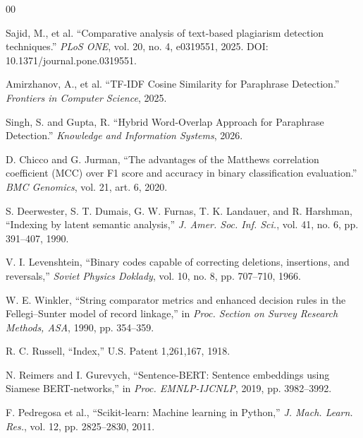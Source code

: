 \documentclass[conference]{IEEEtran}
\begin{document}
\begin{thebibliography}{00}

Sajid, M., et al. ``Comparative analysis of text-based plagiarism
detection techniques.'' \emph{PLoS ONE}, vol. 20, no. 4,
e0319551, 2025. DOI: 10.1371/journal.pone.0319551.

Amirzhanov, A., et al. ``TF-IDF Cosine Similarity for Paraphrase
Detection.'' \emph{Frontiers in Computer Science}, 2025.

Singh, S. and Gupta, R. ``Hybrid Word-Overlap Approach for
Paraphrase Detection.'' \emph{Knowledge and Information Systems},
2026.

D. Chicco and G. Jurman, ``The advantages of the Matthews
correlation coefficient (MCC) over F1 score and accuracy in
binary classification evaluation.'' \emph{BMC Genomics},
vol. 21, art. 6, 2020.

S. Deerwester, S. T. Dumais, G. W. Furnas, T. K. Landauer,
and R. Harshman, ``Indexing by latent semantic analysis,''
\emph{J. Amer. Soc. Inf. Sci.}, vol. 41, no. 6,
pp. 391--407, 1990.

V. I. Levenshtein, ``Binary codes capable of correcting
deletions, insertions, and reversals,'' \emph{Soviet Physics
Doklady}, vol. 10, no. 8, pp. 707--710, 1966.

W. E. Winkler, ``String comparator metrics and enhanced
decision rules in the Fellegi--Sunter model of record
linkage,'' in \emph{Proc. Section on Survey Research
Methods, ASA}, 1990, pp. 354--359.

R. C. Russell, ``Index,'' U.S. Patent 1,261,167, 1918.

N. Reimers and I. Gurevych, ``Sentence-BERT: Sentence
embeddings using Siamese BERT-networks,'' in
\emph{Proc. EMNLP-IJCNLP}, 2019, pp. 3982--3992.

F. Pedregosa et al., ``Scikit-learn: Machine learning
in Python,'' \emph{J. Mach. Learn. Res.}, vol. 12,
pp. 2825--2830, 2011.

\end{thebibliography}
\end{document}
